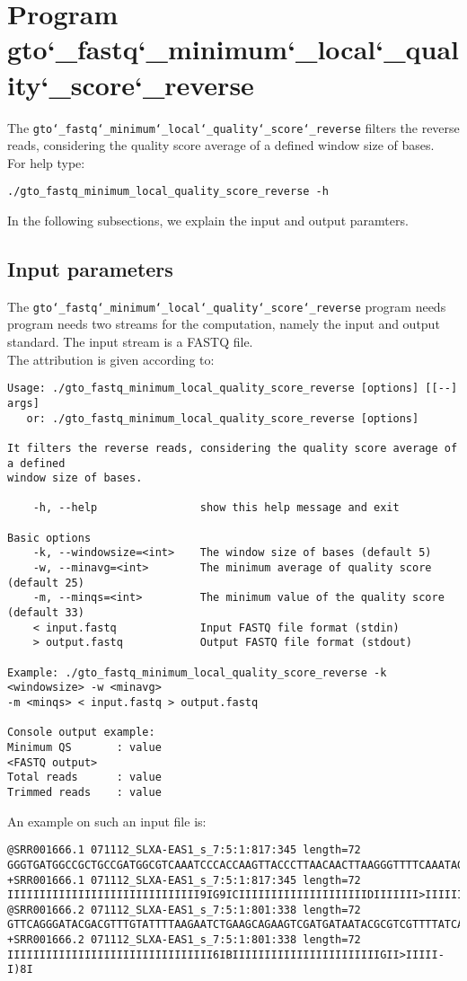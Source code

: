 \section{Program gto\char`_fastq\char`_minimum\char`_local\char`_quality\char`_score\char`_reverse}
The \texttt{gto\char`_fastq\char`_minimum\char`_local\char`_quality\char`_score\char`_reverse} filters the reverse reads, considering the quality score average of a defined window size of bases.\\
For help type:
\begin{lstlisting}
./gto_fastq_minimum_local_quality_score_reverse -h
\end{lstlisting}
In the following subsections, we explain the input and output paramters.

\subsection*{Input parameters}

The \texttt{gto\char`_fastq\char`_minimum\char`_local\char`_quality\char`_score\char`_reverse} program needs program needs two streams for the computation, namely the input and output standard. The input stream is a FASTQ file.\\
The attribution is given according to:
\begin{lstlisting}
Usage: ./gto_fastq_minimum_local_quality_score_reverse [options] [[--] args]
   or: ./gto_fastq_minimum_local_quality_score_reverse [options]

It filters the reverse reads, considering the quality score average of a defined 
window size of bases.

    -h, --help                show this help message and exit

Basic options
    -k, --windowsize=<int>    The window size of bases (default 5)
    -w, --minavg=<int>        The minimum average of quality score (default 25)
    -m, --minqs=<int>         The minimum value of the quality score (default 33)
    < input.fastq             Input FASTQ file format (stdin)
    > output.fastq            Output FASTQ file format (stdout)

Example: ./gto_fastq_minimum_local_quality_score_reverse -k <windowsize> -w <minavg> 
-m <minqs> < input.fastq > output.fastq

Console output example:
Minimum QS       : value
<FASTQ output>
Total reads      : value
Trimmed reads    : value
\end{lstlisting}
An example on such an input file is:
\begin{lstlisting}
@SRR001666.1 071112_SLXA-EAS1_s_7:5:1:817:345 length=72
GGGTGATGGCCGCTGCCGATGGCGTCAAATCCCACCAAGTTACCCTTAACAACTTAAGGGTTTTCAAATAGA
+SRR001666.1 071112_SLXA-EAS1_s_7:5:1:817:345 length=72
IIIIIIIIIIIIIIIIIIIIIIIIIIIIII9IG9ICIIIIIIIIIIIIIIIIIIIIDIIIIIII>IIIIII/
@SRR001666.2 071112_SLXA-EAS1_s_7:5:1:801:338 length=72
GTTCAGGGATACGACGTTTGTATTTTAAGAATCTGAAGCAGAAGTCGATGATAATACGCGTCGTTTTATCAT
+SRR001666.2 071112_SLXA-EAS1_s_7:5:1:801:338 length=72
IIIIIIIIIIIIIIIIIIIIIIIIIIIIIIII6IBIIIIIIIIIIIIIIIIIIIIIIIGII>IIIII-I)8I
\end{lstlisting}

